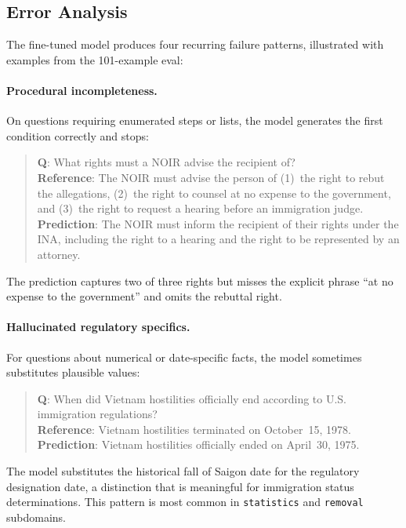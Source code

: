 \documentclass[11pt]{article}
\begin{document}
\subsection{Error Analysis}

The fine-tuned model produces four recurring failure patterns, illustrated with examples from the 101-example eval:

\paragraph{Procedural incompleteness.} On questions requiring enumerated steps or lists, the model generates the first condition correctly and stops:
\begin{quote}
\textbf{Q}: What rights must a NOIR advise the recipient of?\\
\textbf{Reference}: The NOIR must advise the person of (1)~the right to rebut the allegations, (2)~the right to counsel at no expense to the government, and (3)~the right to request a hearing before an immigration judge.\\
\textbf{Prediction}: The NOIR must inform the recipient of their rights under the INA, including the right to a hearing and the right to be represented by an attorney.
\end{quote}
The prediction captures two of three rights but misses the explicit phrase ``at no expense to the government'' and omits the rebuttal right.

\paragraph{Hallucinated regulatory specifics.} For questions about numerical or date-specific facts, the model sometimes substitutes plausible values:
\begin{quote}
\textbf{Q}: When did Vietnam hostilities officially end according to U.S. immigration regulations?\\
\textbf{Reference}: Vietnam hostilities terminated on October~15, 1978.\\
\textbf{Prediction}: Vietnam hostilities officially ended on April~30, 1975.
\end{quote}
The model substitutes the historical fall of Saigon date for the regulatory designation date, a distinction that is meaningful for immigration status determinations. This pattern is most common in \texttt{statistics} and \texttt{removal} subdomains.
\end{document}
